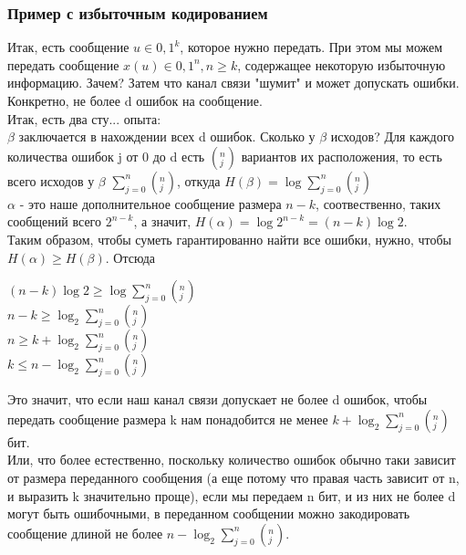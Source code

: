\subsubsection{Пример с избыточным кодированием}
Итак, есть сообщение $u \in {0, 1}^k$, которое нужно передать. При этом мы можем передать сообщение $x(u) \in {0, 1}^n, n \geq k$, содержащее некоторую избыточную информацию. Зачем? Затем что канал связи "шумит" и может допускать ошибки. Конкретно, не более d ошибок на сообщение.\\
Итак, есть два сту... опыта: \\
$\beta$ заключается в нахождении всех d ошибок. Сколько у $\beta$ исходов? Для каждого количества ошибок j от 0 до d есть $(^n_j)$ вариантов их расположения, то есть всего исходов у $\beta$ $\sum\limits_{j = 0}^n (^n_j)$, откуда $H(\beta) = \log \sum\limits_{j = 0}^n (^n_j)$\\
$\alpha$ - это наше дополнительное сообщение размера $n - k$, соотвественно, таких сообщений всего $2^{n - k}$, а значит, $H(\alpha) = \log 2^{n - k} = (n - k) \log 2$.\\
Таким образом, чтобы суметь гарантированно найти все ошибки, нужно, чтобы $H(\alpha) \geq H(\beta)$. Отсюда\\
\begin{center}
$(n - k) \log 2 \geq \log \sum\limits_{j = 0}^n (^n_j)$\\
$n - k \geq \log_2 \sum\limits_{j = 0}^n (^n_j)$\\
$n \geq k + \log_2 \sum\limits_{j = 0}^n (^n_j)$\\
$k \leq n - \log_2 \sum\limits_{j = 0}^n (^n_j)$\\
\end{center}
Это значит, что если наш канал связи допускает не более d ошибок, чтобы передать сообщение размера k нам понадобится не менее $k + \log_2 \sum\limits_{j = 0}^n (^n_j)$ бит.\\
Или, что более естественно, поскольку количество ошибок обычно таки зависит от размера переданного сообщения (а еще потому что правая часть зависит от n, и выразить k значительно проще), если мы передаем n бит, и из них не более d могут быть ошибочными, в переданном сообщении можно закодировать сообщение длиной не более $n - \log_2 \sum\limits_{j = 0}^n (^n_j)$.
